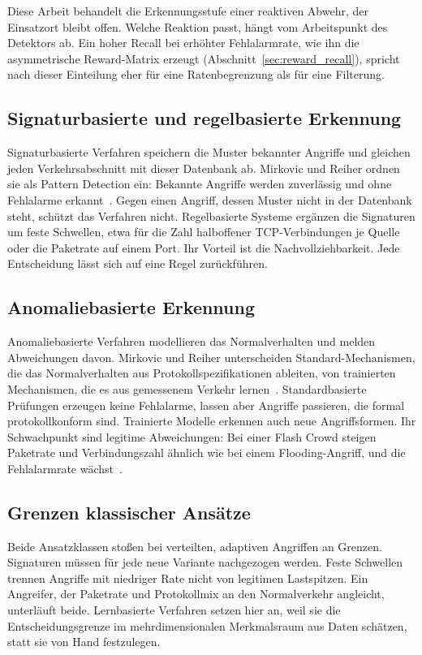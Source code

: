 Diese Arbeit behandelt die Erkennungsstufe einer reaktiven Abwehr, der Einsatzort bleibt offen. Welche Reaktion passt, hängt vom Arbeitspunkt des Detektors ab. Ein hoher Recall bei erhöhter Fehlalarmrate, wie ihn die asymmetrische Reward-Matrix erzeugt (Abschnitt~\ref{sec:reward_recall}), spricht nach dieser Einteilung eher für eine Ratenbegrenzung als für eine Filterung.

\subsection{Signaturbasierte und regelbasierte Erkennung}
Signaturbasierte Verfahren speichern die Muster bekannter Angriffe und gleichen jeden Verkehrsabschnitt mit dieser Datenbank ab. Mirkovic und Reiher ordnen sie als Pattern Detection ein: Bekannte Angriffe werden zuverlässig und ohne Fehlalarme erkannt~\autocite{mirkovicTaxonomyDDoSAttack2004}. Gegen einen Angriff, dessen Muster nicht in der Datenbank steht, schützt das Verfahren nicht. Regelbasierte Systeme ergänzen die Signaturen um feste Schwellen, etwa für die Zahl halboffener TCP-Verbindungen je Quelle oder die Paketrate auf einem Port. Ihr Vorteil ist die Nachvollziehbarkeit. Jede Entscheidung lässt sich auf eine Regel zurückführen.

\subsection{Anomaliebasierte Erkennung}
Anomaliebasierte Verfahren modellieren das Normalverhalten und melden Abweichungen davon. Mirkovic und Reiher unterscheiden Standard-Mechanismen, die das Normalverhalten aus Protokollspezifikationen ableiten, von trainierten Mechanismen, die es aus gemessenem Verkehr lernen~\autocite{mirkovicTaxonomyDDoSAttack2004}. Standardbasierte Prüfungen erzeugen keine Fehlalarme, lassen aber Angriffe passieren, die formal protokollkonform sind. Trainierte Modelle erkennen auch neue Angriffsformen. Ihr Schwachpunkt sind legitime Abweichungen: Bei einer Flash Crowd steigen Paketrate und Verbindungszahl ähnlich wie bei einem Flooding-Angriff, und die Fehlalarmrate wächst~\autocite{kumarComprehensiveReviewVulnerabilities2024}.

\subsection{Grenzen klassischer Ansätze}
Beide Ansatzklassen stoßen bei verteilten, adaptiven Angriffen an Grenzen. Signaturen müssen für jede neue Variante nachgezogen werden. Feste Schwellen trennen Angriffe mit niedriger Rate nicht von legitimen Lastspitzen. Ein Angreifer, der Paketrate und Protokollmix an den Normalverkehr angleicht, unterläuft beide. Lernbasierte Verfahren setzen hier an, weil sie die Entscheidungsgrenze im mehrdimensionalen Merkmalsraum aus Daten schätzen, statt sie von Hand festzulegen.

